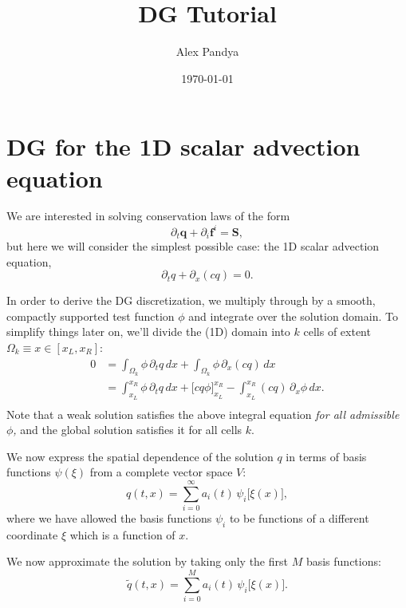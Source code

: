 \documentclass[12pt]{article}
\numberwithin{equation}{section}
\begin{document}
\title{DG Tutorial}
\author{Alex Pandya}
\date{\today}
\maketitle

\section{DG for the 1D scalar advection equation}

We are interested in solving conservation laws of the form
\begin{equation}
\partial_t \bm{q} + \partial_i \bm{f}^i = \bm{S},
\end{equation}
but here we will consider the simplest possible case: the 1D scalar advection equation,
\begin{equation}
\partial_t q + \partial_x (c q) = 0.
\end{equation}

In order to derive the DG discretization, we multiply through by a smooth, compactly supported test function $\phi$ and integrate over the solution domain.
To simplify things later on, we'll divide the (1D) domain into $k$ cells of extent $\Omega_k \equiv x \in [x_L, x_R]$:
\begin{equation} \label{eq:weak_form}
\begin{aligned}
0 &= \int_{\Omega_k} \phi \, \partial_t q \, dx + \int_{\Omega_k} \phi \, \partial_x (c q) \, dx \\
&= \int_{x_L}^{x_R} \phi \, \partial_t q \, dx + \big[ c q \phi \big]^{x_R}_{x_L} - \int_{x_L}^{x_R} (c q) \, \partial_x \phi \, dx. \\
\end{aligned}
\end{equation}
Note that a weak solution satisfies the above integral equation \textit{for all admissible $\phi$,} and the global solution satisfies it for all cells $k$.


We now express the spatial dependence of the solution $q$ in terms of basis functions $\psi(\xi)$ from a complete vector space $V$:
\begin{equation}
q(t,x) = \sum_{i=0}^{\infty} a_i(t) \, \psi_i\big[ \xi(x) \big],
\end{equation}
where we have allowed the basis functions $\psi_i$ to be functions of a different coordinate $\xi$ which is a function of $x$.

We now approximate the solution by taking only the first $M$ basis functions:
\begin{equation}
\tilde{q}(t,x) = \sum_{i=0}^{M} a_i(t) \, \psi_i\big[ \xi(x) \big].
\end{equation}
\end{document}
